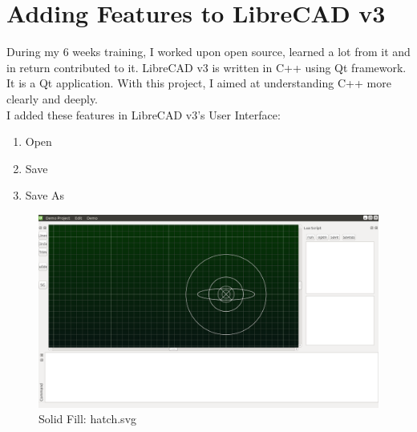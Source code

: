 \section{Adding Features to LibreCAD v3}
During my 6 weeks training, I worked upon open source, learned a lot from it and in return contributed to it. LibreCAD v3 is written in C++ using Qt framework. It is a Qt application. With this project, I aimed at understanding C++ more clearly and deeply.\\
I added these features in LibreCAD v3's User Interface:
\begin{enumerate}
\item Open
\item Save 
\item Save As
\end{enumerate}
\begin{figure}[!ht]
\centering
\includegraphics[scale=0.3]{images/ui.png}
\vspace{-1em}
\caption{Solid Fill: hatch.svg}
\hspace{-1.5em}
\end{figure}

